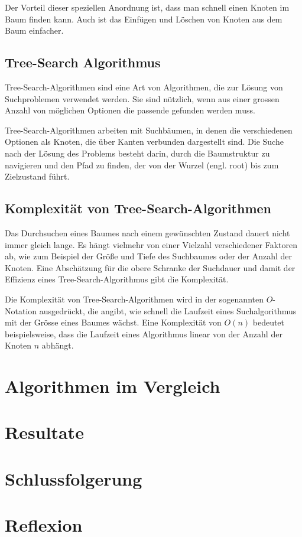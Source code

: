 \documentclass[a4paper,11pt]{article}
\begin{document}
Der Vorteil dieser speziellen Anordnung ist, dass man schnell einen Knoten im Baum finden kann. Auch ist das Einfügen und Löschen von Knoten aus dem Baum einfacher.

\subsection{Tree-Search Algorithmus}
Tree-Search-Algorithmen sind eine Art von Algorithmen, die zur Lösung von Suchproblemen verwendet werden. Sie sind nützlich, wenn aus einer grossen Anzahl von möglichen Optionen die passende gefunden werden muss.

Tree-Search-Algorithmen arbeiten mit Suchbäumen, in denen die verschiedenen Optionen als Knoten, die über Kanten verbunden dargestellt sind. Die Suche nach der Lösung des Problems besteht darin, durch die Baumstruktur zu navigieren und den Pfad zu finden, der von der Wurzel (engl. root) bis zum Zielzustand führt.

\subsection{Komplexität von Tree-Search-Algorithmen}
Das Durchsuchen eines Baumes nach einem gewünschten Zustand dauert nicht immer gleich lange. Es hängt vielmehr von einer Vielzahl verschiedener Faktoren ab, wie zum Beispiel der Größe und Tiefe des Suchbaumes oder der Anzahl der Knoten. Eine Abschätzung für die obere Schranke der Suchdauer und damit der Effizienz eines Tree-Search-Algorithmus gibt die Komplexität. 

Die Komplexität von Tree-Search-Algorithmen wird in der sogenannten $O$-Notation ausgedrückt, die angibt, wie schnell die Laufzeit eines Suchalgorithmus mit der Grösse eines Baumes wächst. Eine Komplexität von $O(n)$ bedeutet beispielsweise, dass die Laufzeit eines Algorithmus linear von der Anzahl der Knoten $n$ abhängt.

\section{Algorithmen im Vergleich}


\section{Resultate}
\section{Schlussfolgerung}
\section{Reflexion}

\pagebreak


\end{document}
